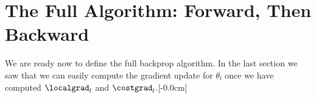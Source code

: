 






\section{The Full Algorithm: Forward, Then Backward}
We are ready now to define the full backprop algorithm. In the last section we saw that we can easily compute the gradient update for $\theta_l$ once we have computed $\localgrad_l$ and $\costgrad_l$.[-0.0cm]

